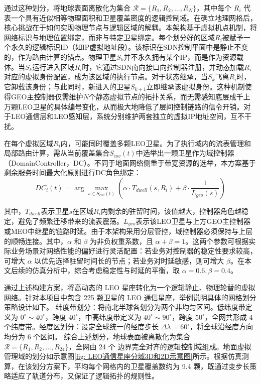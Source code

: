 \documentclass[print, master, vlined]{DissertUESTC}
\begin{document}
    通过这种划分，将地球表面离散化为集合 $\mathcal{R} = \{R_1, R_2, ..., R_N\}$，其中每个 $R_i$ 代表一个具有近似相等物理面积和卫星覆盖密度的逻辑控制域。在确立地理网格后，核心挑战在于如何实现物理节点与逻辑区域的解耦。本架构基于虚拟机点机制，将网络标识与地理位置绑定，而非与特定卫星绑定。每个划分好的区域$R_i$被赋予一个永久的逻辑标识ID（如IP虚拟地址段）。该标识在SDN控制平面中是静止不变的，作为路由计算的锚点。物理卫星$S_k$并不永久拥有某个IP，而是作为资源载体。当$S_k$运行进入区域$R_i$时，它通过SDN南向接口向控制器注册，并动态加载$R_i$对应的虚拟身份配置，成为该区域的执行节点。对于状态继承，当$S_k$飞离$R_i$时，它卸载该身份；与此同时，新进入的卫星$S_{k+1}$立即继承该虚拟身份。这种机制使得GEO主控制器仅需维护$N$个静态虚拟节点的拓扑关系，而无需感知底层成千上万颗LEO卫星的具体编号变化，从而极大地降低了层间控制链路的信令开销。对于LEO通信层和LEO感知层，系统分别维护两套独立的虚拟IP地址空间，互不干扰。

    在每个虚拟区域$R_i$内，可能同时覆盖多颗LEO卫星。为了执行域内的流表管理和局部路由计算，需从当前覆盖集合$S_{cov}(t)$中选举出一颗卫星作为域控制器（DomainController，DC）。不同于地面网络侧重于带宽资源的选举，本方案基于剩余服务时间最大化原则进行DC角色绑定：
    \begin{equation}
        DC_i(t)=\arg\max_{s\in S_{cov}(t)}\left(\alpha \cdot T_{dwell}(s,R_i)+\beta \cdot \frac{1}{L_{geo}(s)}\right)
    \end{equation}
    
    其中，$T_{dwell}$表示卫星$s$在区域$R_i$内剩余的驻留时间，该值越大，控制器角色越稳定，避免了频繁迁移带来的流表震荡。$L_{geo}$表示该LEO卫星与上方GEO主控制器或MEO中继星的链路时延。由于本架构采用分层管控，域控制器必须保持与上层的顺畅连接。其中，$\alpha$ 和 $\beta$ 为非负权重系数，且 $\alpha + \beta = 1$。这两个参数可根据实际业务场景对网络性能的偏好进行灵活配置：若业务对控制器的稳定性要求较高，可增大 $\alpha$ 以优先选择驻留时间长的节点；若业务对时延敏感，则可增大 $\beta$。在本文后续的仿真分析中，综合考虑稳定性与时延的平衡，取 $\alpha=0.6, \beta=0.4$。

    通过上述构建方案，将高动态的 LEO 星座转化为一个逻辑静止、物理轮替的虚拟网络。针对本项目中包含 225 颗卫星的 LEO 通信星座，举例说明具体的网格划分策略设计如下。 纬度带划分：将南北半球各划分为两个非均匀区间。低纬度带定义为 $0^{\circ} \sim 40^{\circ}$，跨度 $40^{\circ}$，中高纬度带定义为 $40^{\circ} \sim 90^{\circ}$，跨度 $50^{\circ}$，全网共形成 4 个纬度带。经度区划分：设定全球统一的经度步长 $\Delta \lambda = 60^{\circ}$，将全球沿经度方向均分为 6 个区间。
        综合上述划分，地球表面被离散化为集合 $\mathcal{R} = \{R_1, R_2, ..., R_{24}\}$，全网由 24 个 边界完全对齐的逻辑控制域组成。地面虚拟管理域的划分如示意图\ref{fig: LEO通信星座分域3D和2D示意图}所示。根据仿真测算，在该划分方案下，平均每个网格内的卫星覆盖数约为 9.4 颗，既通过变步长策略适应了轨道分布，又保证了逻辑拓扑的规则性。
     
\end{document}
